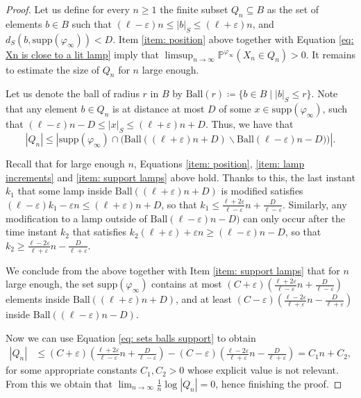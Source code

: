 \documentclass[reqno,oneside,11pt]{amsart}
\renewcommand{\P}{\mathbb{P}}
\newcommand{\supp}[1]{\mathrm{supp}(#1)}
\theoremstyle{plain}
\theoremstyle{definition}
\begin{document}
\begin{proof}
	Let us define for every $n\ge 1$ the finite subset $Q_n\subseteq B$ as the set of elements $b\in B$ such that $(\ell-\varepsilon)n\le|b|_S\le (\ell+\varepsilon)n$, and $d_S(b,\supp{\varphi_\infty})<D$. Item \eqref{item: position} above together with Equation \eqref{eq: Xn is close to a lit lamp} imply that $\limsup_{n\to \infty}\P^{\varphi_{\infty}}(X_n\in Q_n)>0$. It remains to estimate the size of $Q_n$ for $n$ large enough. 
	
	Let us denote the ball of radius $r$ in $B$ by $\mathrm{Ball}(r)\coloneqq \{b\in B\mid |b|_S\le r\}$. Note that any element $b\in Q_n$ is at distance at most $D$ of some $x\in \supp{\varphi_{\infty}}$, such that $(\ell-\varepsilon)n-D\le |x|_S\le (\ell+\varepsilon)n+D$. Thus, we have that 
	\begin{equation}\label{eq: sets balls support} |Q_n|\le \left|\supp{\varphi_{\infty}}\cap \Big(\mathrm{Ball}((\ell+\varepsilon)n +D)\backslash\mathrm{Ball}(\ell-\varepsilon)n -D) \Big)\right|. \end{equation}
	
	Recall that for large enough $n$, Equations \eqref{item: position}, \eqref{item: lamp increments} and \eqref{item: support lamps} above hold. Thanks to this, the last instant $k_1$ that some lamp inside $\mathrm{Ball}((\ell+\varepsilon)n +D)$ is modified satisfies $(\ell-\varepsilon)k_1-\varepsilon n\le (\ell+\varepsilon)n+D$, so that $ k_1\le \frac{\ell+2\varepsilon}{\ell-\varepsilon}n+\frac{D}{\ell-\varepsilon}. $ Similarly, any modification to a lamp outside of $\mathrm{Ball}(\ell-\varepsilon)n -D)$ can only occur after the time instant $k_2$ that satisfies $k_2(\ell+\varepsilon)+\varepsilon n\ge (\ell-\varepsilon)n-D$, so that $ k_2\ge \frac{\ell-2\varepsilon}{\ell+\varepsilon}n-\frac{D}{\ell+\varepsilon}. $
	
	We conclude from the above together with Item \eqref{item: support lamps} that for $n$ large enough, the set $\supp{\varphi_{\infty}}$ contains at most $(C+\varepsilon)\left(\frac{\ell+2\varepsilon}{\ell-\varepsilon}n+\frac{D}{\ell-\varepsilon} \right)$ elements inside $\mathrm{Ball}((\ell+\varepsilon)n +D)$, and at least $(C-\varepsilon)\left(\frac{\ell-2\varepsilon}{\ell+\varepsilon}n-\frac{D}{\ell+\varepsilon} \right)$ inside $\mathrm{Ball}((\ell-\varepsilon)n -D)$.
	
	Now we can use Equation \eqref{eq: sets balls support} to obtain
	\begin{align*}
		|Q_n|&\le (C+\varepsilon)\left(\frac{\ell+2\varepsilon}{\ell-\varepsilon}n+\frac{D}{\ell-\varepsilon} \right) -(C-\varepsilon)\left(\frac{\ell-2\varepsilon}{\ell+\varepsilon}n-\frac{D}{\ell+\varepsilon} \right)=C_1n+C_2,
	\end{align*}
	for some appropriate constants $C_1,C_2>0$ whose explicit value is not relevant. From this we obtain that $\lim_{n\to \infty}\frac{1}{n}\log|Q_n|=0$, hence finishing the proof.
\end{proof}
\end{document}
